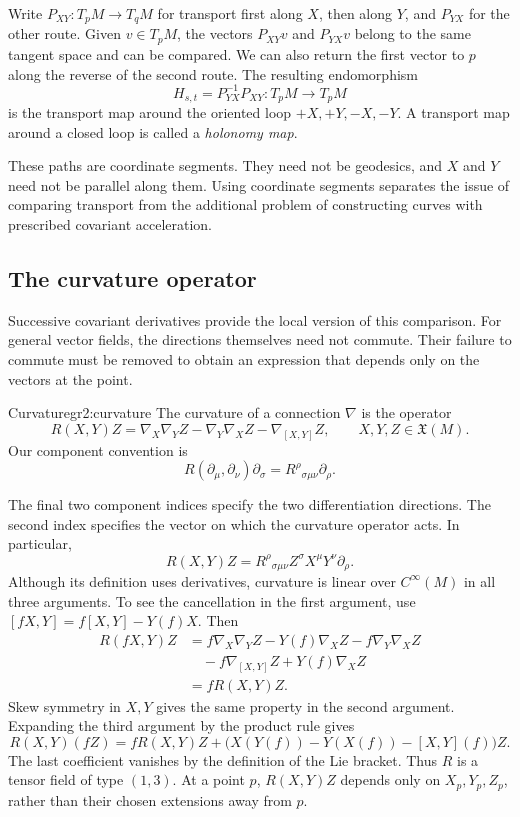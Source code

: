 \documentclass[11pt,a4paper]{article}
\numberwithin{equation}{section}
\newcommand{\Cinf}{C^\infty}
\newcommand{\X}{\mathfrak X}
\newcommand{\slideref}[1]{\par\nobreak\smallskip\nobreak{\footnotesize\color{ink!60}\textsc{Source slide #1}}\par\nobreak\smallskip\nobreak}
\begin{document}
Write \(P_{XY}:T_pM\to T_qM\) for transport first along \(X\), then
along \(Y\), and \(P_{YX}\) for the other route. Given \(v\in T_pM\),
the vectors \(P_{XY}v\) and \(P_{YX}v\) belong to the same tangent space
and can be compared. We can also return the first vector to \(p\) along
the reverse of the second route. The resulting endomorphism
\[
 H_{s,t}=P_{YX}^{-1}P_{XY}:T_pM\longrightarrow T_pM
\]
is the transport map around the oriented loop
\(+X,+Y,-X,-Y\). A transport map around a closed loop is called a
\emph{holonomy map}.

These paths are coordinate segments. They need not be geodesics, and
\(X\) and \(Y\) need not be parallel along them. Using coordinate
segments separates the issue of comparing transport from the additional
problem of constructing curves with prescribed covariant acceleration.

\subsection{The curvature operator}
\slideref{9}

Successive covariant derivatives provide the local version of this
comparison. For general vector fields, the directions themselves need not
commute. Their failure to commute must be removed to obtain an expression
that depends only on the vectors at the point.

\begin{definition}{Curvature}{gr2:curvature}
The curvature of a connection \(\nabla\) is the operator
\begin{equation}
 R(X,Y)Z
 =\nabla_X\nabla_YZ-\nabla_Y\nabla_XZ-\nabla_{[X,Y]}Z,
 \qquad X,Y,Z\in\X(M).
 \label{gr2:eq-curvature-definition}
\end{equation}
Our component convention is
\begin{equation}
 R(\partial_\mu,\partial_\nu)\partial_\sigma
 =R^\rho{}_{\sigma\mu\nu}\partial_\rho.
 \label{gr2:eq-curvature-components}
\end{equation}
\end{definition}

The final two component indices specify the two differentiation
directions. The second index specifies the vector on which the curvature
operator acts. In particular,
\[
 R(X,Y)Z
 =R^\rho{}_{\sigma\mu\nu}Z^\sigma X^\mu Y^\nu\partial_\rho.
\]
Although its definition uses derivatives, curvature is linear over
\(\Cinf(M)\) in all three arguments. To see the cancellation in the
first argument, use
\([fX,Y]=f[X,Y]-Y(f)X\). Then
\begin{align*}
 R(fX,Y)Z
 &=f\nabla_X\nabla_YZ-Y(f)\nabla_XZ-f\nabla_Y\nabla_XZ\\
 &\quad-f\nabla_{[X,Y]}Z+Y(f)\nabla_XZ\\
 &=fR(X,Y)Z.
\end{align*}
Skew symmetry in \(X,Y\) gives the same property in the second argument.
Expanding the third argument by the product rule gives
\[
 R(X,Y)(fZ)
 =fR(X,Y)Z+
 \bigl(X(Y(f))-Y(X(f))-[X,Y](f)\bigr)Z.
\]
The last coefficient vanishes by the definition of the Lie bracket.
Thus \(R\) is a tensor field of type \((1,3)\). At a point \(p\),
\(R(X,Y)Z\) depends only on \(X_p,Y_p,Z_p\), rather than their chosen
extensions away from \(p\).
\end{document}
